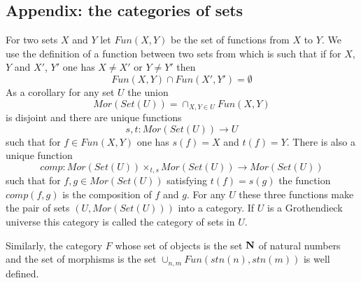 \documentclass[11pt]{article}
\newcommand{\sr}{\rightarrow}
\newcommand{\nn}{{\bf N\rm}}
\begin{document}
\subsection{Appendix: the categories of sets}
%
For two sets $X$ and $Y$ let $Fun(X,Y)$ be the set of functions from $X$ to $Y$. We use the definition of a function between two sets from \cite[p.81]{Bourbaki} which is such that if for $X$, $Y$ and $X'$, $Y'$ one has $X\ne X'$ or $Y\ne Y'$ then  
%
$$Fun(X,Y)\cap Fun(X',Y')=\emptyset$$
%
As a corollary for any set $U$ the union 
%
$$Mor(Set(U))=\cap_{X,Y\in U}Fun(X,Y)$$
%
is disjoint and there are unique functions
%
$$s,t:Mor(Set(U))\sr U$$
%
such that for $f\in Fun(X,Y)$ one has $s(f)=X$ and $t(f)=Y$. There is also a unique function 
%
$$comp:Mor(Set(U))\times_{t,s}Mor(Set(U))\sr Mor(Set(U))$$
%
such that for $f,g\in Mor(Set(U))$ satisfying $t(f)=s(g)$ the function $comp(f,g)$ is the composition of $f$ and $g$. For any $U$ these three functions make the pair of sets $(U,Mor(Set(U)))$ into a category. If $U$ is a Grothendieck universe this category is called the category of sets in $U$.

Similarly, the category $F$ whose set of objects is the set $\nn$ of natural numbers and the set of morphisms is the set $\cup_{n,m}Fun(stn(n),stn(m))$ is well defined. 
%













%
%





\end{document}
